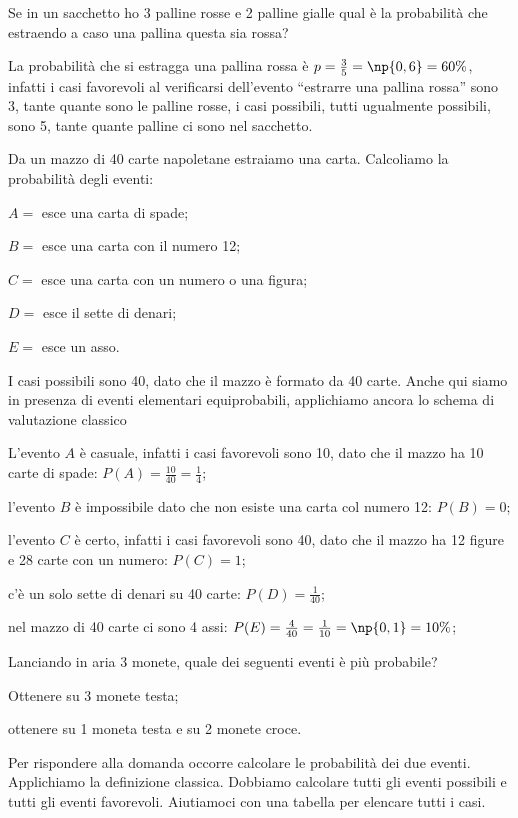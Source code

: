 \begin{exrig}
\begin{esempio}
Se in un sacchetto ho 3 palline rosse e 2 palline gialle qual è la probabilità che estraendo a caso una pallina questa sia rossa?

La probabilità che si estragga una pallina rossa è $p=\frac 3 5=\np{0,6}=60\text{\%}$, infatti i casi favorevoli al verificarsi dell'evento ``estrarre una pallina rossa'' sono 3, tante quante sono le palline rosse, i casi possibili, tutti ugualmente possibili, sono 5, tante quante palline ci sono nel sacchetto.
\end{esempio}

\begin{esempio}
Da un mazzo di 40 carte napoletane estraiamo una carta. Calcoliamo la probabilità degli eventi:
\begin{itemize*}
\item $A=$ esce una carta di spade;
\item $B=$ esce una carta con il numero 12;
\item $C=$ esce una carta con un numero o una figura;
\item $D=$ esce il sette di denari;
\item $E=$ esce un asso.
\end{itemize*}
I casi possibili sono 40, dato che il mazzo è formato da 40 carte. Anche qui siamo in presenza di eventi elementari equiprobabili, applichiamo ancora lo schema di valutazione classico
\begin{itemize*}
\item L'evento $A$ è casuale, infatti i casi favorevoli sono 10, dato che il mazzo ha 10 carte di spade: $P(A)=\frac{10}{40}=\frac 1 4$;
\item l'evento $B$ è impossibile dato che non esiste una carta col numero 12: $P(B)=0$;
\item l'evento $C$ è certo, infatti i casi favorevoli sono 40, dato che il mazzo ha 12 figure e 28 carte con un numero: $P(C)=1$;
\item c'è un solo sette di denari su 40 carte: $P(D)=\frac 1{40}$;
\item nel mazzo di 40 carte ci sono 4 assi: $P(E)=\frac 4{40}=\frac 1{10}=\np{0,1}=10\%$;
\end{itemize*}
\end{esempio}

\begin{esempio}
Lanciando in aria 3 monete, quale dei seguenti eventi è più probabile?
\begin{itemize*}
\item Ottenere su 3 monete testa;
\item ottenere su 1 moneta testa e su 2 monete croce.
\end{itemize*}
Per rispondere alla domanda occorre calcolare le probabilità dei due eventi. Applichiamo la definizione classica. Dobbiamo calcolare tutti gli eventi possibili e tutti gli eventi favorevoli.
Aiutiamoci con una tabella per elencare tutti i casi.


\end{esempio}
\end{exrig}
